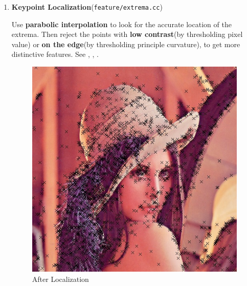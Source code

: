 \begin{enumerate}
  \item \textbf{Keypoint Localization}(\verb|feature/extrema.cc|)

    Use \textbf{parabolic interpolation} to look for the accurate location of the extrema.
    Then reject the points with \textbf{low contrast}(by thresholding pixel value)
    or \textbf{on the edge}(by thresholding principle curvature), to get more distinctive features.
    See , , .
    \begin{figure}[H]
      \begin{minipage}[b]{0.46\linewidth}
        \centering
        \includegraphics[scale=0.4]{res/feature_after_offset.png}
        \caption{After Localization \label{fig:feature1}}
      \end{minipage}
      \hspace{1em}
      \begin{minipage}[b]{0.46\linewidth}
        \centering

\end{minipage}
\end{figure}
\end{enumerate}
